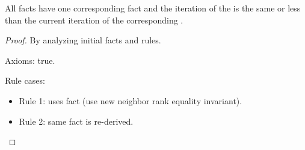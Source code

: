 \begin{invariant}
All  facts have one corresponding
 fact and the iteration of the 
is the same or less than the current iteration of the corresponding
.
\end{invariant}
\begin{proof}
By analyzing initial facts and rules.

Axioms: true.

Rule cases:

\begin{itemize}
   \item Rule 1: uses  fact (use new neighbor rank
         equality invariant).
   \item Rule 2: same fact is re-derived.
\end{itemize}
\end{proof}

